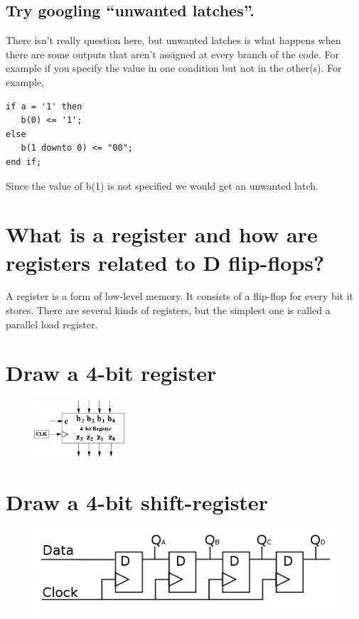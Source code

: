 \documentclass{article}
\begin{document}
\subsection{Try googling ``unwanted latches''.}
There isn't really question here, but unwanted latches is what happens
when there are some outputs that aren't assigned at every branch of
the code. For example if you specify the value in one condition but
not in the other(s). For example,

\begin{lstlisting}
if a = '1' then
   b(0) <= '1';
else
   b(1 downto 0) <= "00";
end if;
\end{lstlisting}

Since the value of b(1) is not specified we would get an unwanted
latch.

\section{What is a register and how are registers related to D
  flip-flops?}
A register is a form of low-level memory. It consists of a flip-flop
for every bit it stores. There are several kinds of registers, but the
simplest one is called a parallel load register.

\section{Draw a 4-bit register}
\begin{figure}[hbp]
  \centering
  \includegraphics[width=0.3\textwidth]{images/4-bit-register}
\end{figure}

\section{Draw a 4-bit shift-register}
\begin{figure}[hbp]
  \centering
  \includegraphics[width=\textwidth]{images/4-Bit-Shift-Register}
\end{figure}
\end{document}
